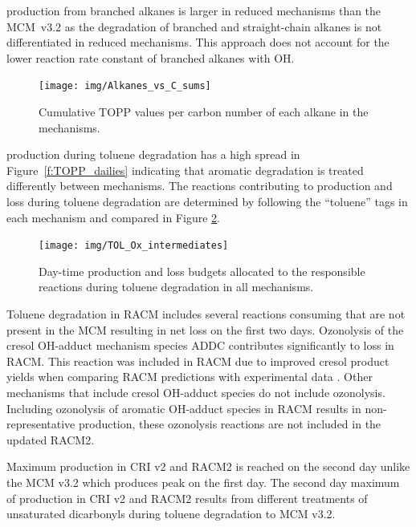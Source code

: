  production from branched alkanes is larger in reduced mechanisms than the \mbox{MCM v3.2} as the degradation of branched and straight-chain alkanes is not differentiated in reduced mechanisms.
This approach does not account for the lower reaction rate constant of branched alkanes with OH.

\begin{figure}
    \centering
    \texttt{[image: img/Alkanes\_vs\_C\_sums]}
    \vspace{0mm}
    \caption{Cumulative TOPP values per carbon number of each alkane in the mechanisms.}
    \vspace{-4mm}
    \label{f:alkane_C}
\end{figure}

 production during toluene degradation has a high spread in \mbox{Figure \ref{f:TOPP_dailies}} indicating that aromatic degradation is treated differently between mechanisms.
The reactions contributing to  production and loss during toluene degradation are determined by following the ``toluene'' tags in each mechanism and compared in Figure \ref{f:toluene_Ox}.

\begin{figure}
    \centering
    \texttt{[image: img/TOL\_Ox\_intermediates]}
    \vspace{0mm}
    \caption{Day-time  production and loss budgets allocated to the responsible reactions during toluene degradation in all mechanisms.}
    \vspace{-4mm}
    \label{f:toluene_Ox}
\end{figure}

Toluene degradation in RACM includes several reactions consuming  that are not present in the MCM resulting in net  loss on the first two days.
Ozonolysis of the cresol OH-adduct mechanism species ADDC contributes significantly to  loss in RACM.
This reaction was included in RACM due to improved cresol product yields when comparing RACM predictions with experimental data \citep{Stockwell:1997}. 
Other mechanisms that include cresol OH-adduct species do not include ozonolysis.
Including ozonolysis of aromatic OH-adduct species in RACM results in non-representative  production, these ozonolysis reactions are not included in the updated RACM2.

Maximum  production in CRI v2 and RACM2 is reached on the second day unlike the MCM v3.2 which produces peak  on the first day.
The second day maximum of  production in CRI v2 and RACM2 results from different treatments of unsaturated dicarbonyls during toluene degradation to MCM v3.2.

